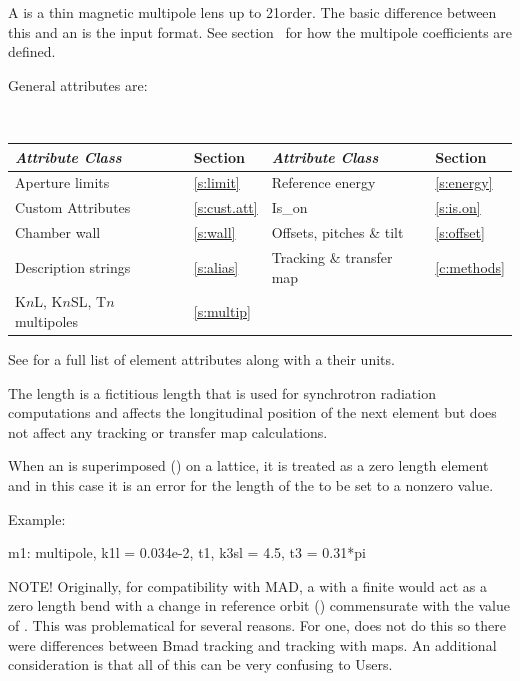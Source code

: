 {A  is a thin magnetic multipole lens up to 21\St order. The basic
difference between this and an  is the input
format. See section~ for how the multipole coefficients
are defined.

General  attributes are:
\begin{center}
\tt 
\begin{tabular}{llll} \toprule
  {\sl Attribute Class}          & Section           & {\sl Attribute Class}      & Section         \\ \midrule
  Aperture limits                & \ref{s:limit}     & Reference energy           & \ref{s:energy}  \\
  Custom Attributes              & \ref{s:cust.att}  & Is_on                      & \ref{s:is.on}   \\ 
  Chamber wall                   & \ref{s:wall}      & Offsets, pitches \& tilt   & \ref{s:offset}  \\
  Description strings            & \ref{s:alias}     & Tracking \& transfer map   & \ref{c:methods} \\ 
  K$n$L, K$n$SL, T$n$ multipoles & \ref{s:multip}    &                            &                 \\
  \bottomrule
\end{tabular}
\end{center}
\toffset
See  for a full list of element attributes along with a their units.

The length  is a fictitious length that is used for synchrotron
radiation computations and affects the longitudinal position of the
next element but does not affect any tracking or transfer map
calculations.

When an  is superimposed () on a lattice, it is
treated as a zero length element and in this case it is an error for the length
of the  to be set to a nonzero value.

Example:
\begin{example}
  m1: multipole, k1l = 0.034e-2, t1, k3sl = 4.5, t3 = 0.31*pi
\end{example}

NOTE! Originally, for compatibility with MAD, a \bmad {} with a finite  would
act as a zero length bend with a change in reference orbit () commensurate with the
value of . This was problematical for several reasons. For one,  does not do this so
there were differences between Bmad tracking and tracking with maps. An additional consideration is
that all of this can be very confusing to Users.

}
